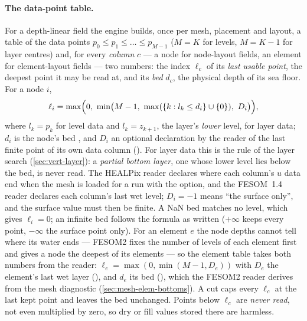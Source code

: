 \paragraph{The data-point table.} For a depth-linear field the engine builds, once per mesh, placement
and layout, a table of the data points $p_0\le p_1\le\dots\le p_{M-1}$ ($M=K$ for levels, $M=K-1$ for
layer centres) and, for every \emph{column} $c$ --- a node for node-layout fields, an element for
element-layout fields --- two numbers: the index $\ell_c$ of its \emph{last usable point}, the deepest
point it may be read at, and its \emph{bed} $d_c$, the physical depth of its sea floor. For a node $i$,
\begin{equation}\label{eq:vert-uv-last}
  \ell_i = \max\Bigl(0,\ \min\bigl(M-1,\ \max(\{k : l_k\le d_i\}\cup\{0\}),\ D_i\bigr)\Bigr),
\end{equation}
where $l_k=p_k$ for level data and $l_k=z_{k+1}$, the layer's \emph{lower} level, for layer data;
$d_i$ is the node's bed , and $D_i$ an optional declaration by the reader of the last
finite point of its own data column (). For layer data this is the
rule of the layer search (\cref{sec:vert-layer}): a \emph{partial bottom layer}, one whose lower level lies
below the bed, is never read. The HEALPix reader declares where each column's $u$ data end when the mesh
is loaded for a run with the option, and the FESOM~1.4 reader declares each column's last wet level; $D_i=-1$ means ``the surface only'', and the
surface value must then be finite. A NaN bed matches no level, which gives $\ell_i=0$; an infinite bed
follows the formula as written ($+\infty$ keeps every point, $-\infty$ the surface point only). For an
element $e$ the node depths cannot tell where its water ends --- FESOM2 fixes the number of levels of each
element first and gives a node the deepest of its elements --- so the element table takes both numbers
from the reader: $\ell_e=\max(0,\min(M-1,D_e))$ with $D_e$ the element's last wet layer
(), and $d_e$ its bed (), which the FESOM2 reader derives from
the mesh diagnostic (\cref{sec:mesh-elem-bottoms}). A  cut caps every $\ell_c$ at
the last kept point and leaves the bed unchanged. Points below $\ell_c$ are \emph{never read}, not even
multiplied by zero, so dry or fill values stored there are harmless.


